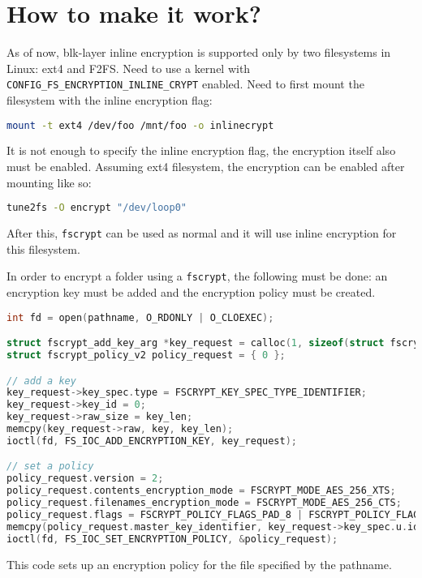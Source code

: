 \documentclass[
  digital, %
  oneside, %
  nolof,     %
  nolot,     %
]{fithesis4}
\begin{document}
\section{How to make it work?}

As of now, blk-layer inline encryption is supported only by two filesystems in Linux: ext4 and F2FS.
Need to use a kernel with \verb|CONFIG_FS_ENCRYPTION_INLINE_CRYPT| enabled.
Need to first mount the filesystem with the inline encryption flag:
\begin{lstlisting}[language=bash]
mount -t ext4 /dev/foo /mnt/foo -o inlinecrypt
\end{lstlisting}
It is not enough to specify the inline encryption flag, the encryption itself also must be enabled. Assuming ext4 filesystem, the encryption can be enabled after mounting like so:
\begin{lstlisting}[language=bash]
tune2fs -O encrypt "/dev/loop0"
\end{lstlisting}
After this, \verb|fscrypt| can be used as normal and it will use inline encryption for this filesystem. 

In order to encrypt a folder using a \verb|fscrypt|, the following must be done: an encryption key must be added and the encryption policy must be created.

\begin{lstlisting}[language=c]
int fd = open(pathname, O_RDONLY | O_CLOEXEC);

struct fscrypt_add_key_arg *key_request = calloc(1, sizeof(struct fscrypt_add_key_arg) + key_len);
struct fscrypt_policy_v2 policy_request = { 0 };

// add a key
key_request->key_spec.type = FSCRYPT_KEY_SPEC_TYPE_IDENTIFIER;
key_request->key_id = 0;
key_request->raw_size = key_len;
memcpy(key_request->raw, key, key_len);
ioctl(fd, FS_IOC_ADD_ENCRYPTION_KEY, key_request);

// set a policy
policy_request.version = 2;
policy_request.contents_encryption_mode = FSCRYPT_MODE_AES_256_XTS;
policy_request.filenames_encryption_mode = FSCRYPT_MODE_AES_256_CTS;
policy_request.flags = FSCRYPT_POLICY_FLAGS_PAD_8 | FSCRYPT_POLICY_FLAGS_PAD_16 | FSCRYPT_POLICY_FLAGS_PAD_32;
memcpy(policy_request.master_key_identifier, key_request->key_spec.u.identifier, FSCRYPT_KEY_IDENTIFIER_SIZE);
ioctl(fd, FS_IOC_SET_ENCRYPTION_POLICY, &policy_request);
\end{lstlisting}

This code sets up an encryption policy for the file specified by the pathname. 
\end{document}
